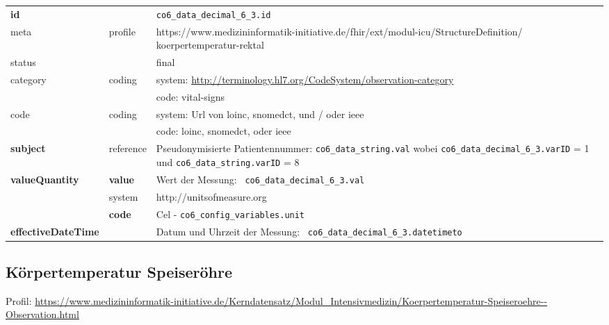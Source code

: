 \begin{longtable}{|l|l|p{7.5cm}|}
	\hline
	\rowcolor{lightgray} \multicolumn{3}{|l|}{Data Mapping (inhaltlich)} \\ \hline
	\textbf{id} &  & \texttt{co6\_data\_decimal\_6\_3.id} \\ \hline
	meta & profile & https://www.medizininformatik-initiative.de/fhir/ext/modul-icu/StructureDefinition/ koerpertemperatur-rektal \\ \hline 
	status &  & final   \\ \hline 
	category & coding & system: \url{http://terminology.hl7.org/CodeSystem/observation-category} \\
	\cline{3-3}
	& & code: vital-signs \\ \hline
	code & coding & system: Url von \ac{loinc}, \ac{snomedct}, und / oder \ac{ieee} \\ 
	\cline{3-3} 
	&  & code: \ac{loinc}, \ac{snomedct}, oder \ac{ieee} \\ \hline
	\textbf{subject} & reference & Pseudonymisierte Patientennummer: \texttt{co6\_data\_string.val} wobei \texttt{co6\_data\_decimal\_6\_3.varID} = 1 und \texttt{co6\_data\_string.varID} = 8 \\ \hline
	\textbf{valueQuantity}  & \textbf{value} & Wert der Messung: \texttt{
		co6\_data\_decimal\_6\_3.val} \\
	\cline{2-3}
	& system & http://unitsofmeasure.org \\
	\cline{2-3}
	& \textbf{code} & Cel - \texttt{co6\_config\_variables.unit} \\ \hline
	\textbf{effectiveDateTime}  & & Datum und Uhrzeit der Messung: \texttt{
		co6\_data\_decimal\_6\_3.datetimeto} \\ \hline
\end{longtable}


\subsection{Körpertemperatur Speiseröhre} 
Profil: \url{https://www.medizininformatik-initiative.de/Kerndatensatz/Modul_Intensivmedizin/Koerpertemperatur-Speiseroehre--Observation.html}

